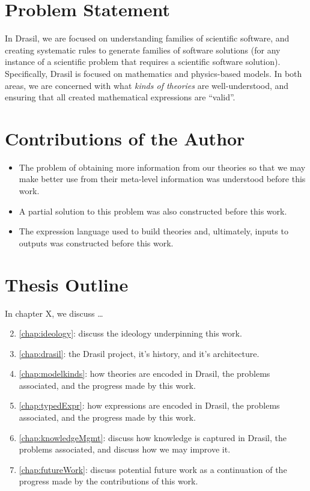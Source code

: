 \section{Problem Statement}

In Drasil, we are focused on understanding families of scientific software, and
creating systematic rules to generate families of software solutions (for any
instance of a scientific problem that requires a scientific software solution).
Specifically, Drasil is focused on mathematics and physics-based models. In both
areas, we are concerned with what \textit{kinds of theories} are
well-understood, and ensuring that all created mathematical expressions are
``valid''.


\section{Contributions of the Author}

\begin{itemize}
      \item The problem of obtaining more information from our theories so that we
            may make better use from their meta-level information was understood
            before this work.
      \item A partial solution to this problem was also constructed before this
            work.
      \item The expression language used to build theories and, ultimately, inputs
            to outputs was constructed before this work.
\end{itemize}

\section{Thesis Outline}

In chapter X, we discuss \dots
\begin{enumerate}
      \setcounter{enumi}{1}
      \item \autoref{chap:ideology}: discuss the ideology underpinning this work.
      \item \autoref{chap:drasil}: the Drasil project, it's history, and it's
            architecture.
      \item \autoref{chap:modelkinds}: how theories are encoded in Drasil, the
            problems associated, and the progress made by this work.
      \item \autoref{chap:typedExpr}: how expressions are encoded in Drasil, the
            problems associated, and the progress made by this work.
      \item \autoref{chap:knowledgeMgmt}: discuss how knowledge is captured in
            Drasil, the problems associated, and discuss how we may improve it.
      \item \autoref{chap:futureWork}: discuss potential future work as a
            continuation of the progress made by the contributions of this work.
\end{enumerate}

